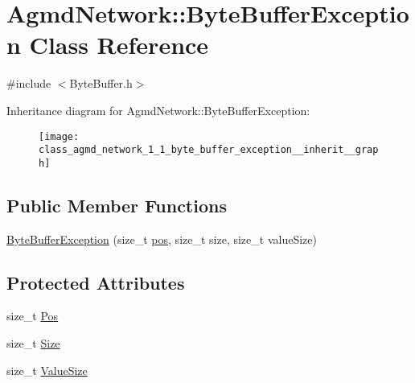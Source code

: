 \hypertarget{class_agmd_network_1_1_byte_buffer_exception}{\section{Agmd\+Network\+:\+:Byte\+Buffer\+Exception Class Reference}
\label{class_agmd_network_1_1_byte_buffer_exception}
}


{\ttfamily \#include $<$Byte\+Buffer.\+h$>$}



Inheritance diagram for Agmd\+Network\+:\+:Byte\+Buffer\+Exception\+:\nopagebreak
\begin{figure}[H]
\begin{center}
\leavevmode
\texttt{[image: class\_agmd\_network\_1\_1\_byte\_buffer\_exception\_\_inherit\_\_graph]}
\end{center}
\end{figure}
\subsection*{Public Member Functions}
\begin{DoxyCompactItemize}
\item 
\hyperlink{class_agmd_network_1_1_byte_buffer_exception_ad72ebc137d83204bebcbb95dbeba21dd}{Byte\+Buffer\+Exception} (size\+\_\+t \hyperlink{_examples_2_planet_2_app_8cpp_aa8a1c0491559faca4ebd0881575ae7f0}{pos}, size\+\_\+t size, size\+\_\+t value\+Size)
\end{DoxyCompactItemize}
\subsection*{Protected Attributes}
\begin{DoxyCompactItemize}
\item 
size\+\_\+t \hyperlink{class_agmd_network_1_1_byte_buffer_exception_a6b4c1bdfe4ed95435e94af7766303125}{Pos}
\item 
size\+\_\+t \hyperlink{class_agmd_network_1_1_byte_buffer_exception_a4040428cb697f99cb4dbab00c1fe6fd3}{Size}
\item 
size\+\_\+t \hyperlink{class_agmd_network_1_1_byte_buffer_exception_ae28dfd2f4d2c0c8a4180f14d9d5b7d0b}{Value\+Size}
\end{DoxyCompactItemize}


